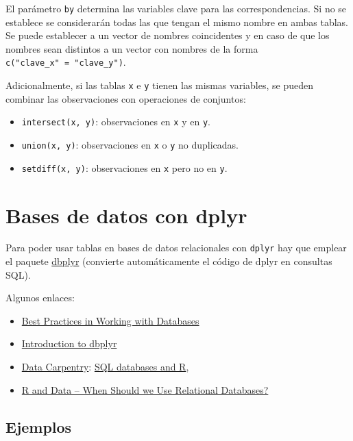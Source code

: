 \documentclass[
]{book}
\theoremstyle{break}
\theoremstyle{nonumberplain}
\begin{document}
El parámetro \texttt{by} determina las variables clave para las correspondencias.
Si no se establece se considerarán todas las que tengan el mismo nombre en ambas tablas.
Se puede establecer a un vector de nombres coincidentes y en caso de que los nombres sean distintos a un vector con nombres de la forma \texttt{c("clave\_x"\ =\ "clave\_y")}.

Adicionalmente, si las tablas \texttt{x} e \texttt{y} tienen las mismas variables, se pueden combinar las observaciones con operaciones de conjuntos:

\begin{itemize}
\item
  \texttt{intersect(x,\ y)}: observaciones en \texttt{x} y en \texttt{y}.
\item
  \texttt{union(x,\ y)}: observaciones en \texttt{x} o \texttt{y} no duplicadas.
\item
  \texttt{setdiff(x,\ y)}: observaciones en \texttt{x} pero no en \texttt{y}.
\end{itemize}

\hypertarget{dbplyr}{%
\section{Bases de datos con dplyr}\label{dbplyr}}

Para poder usar tablas en bases de datos relacionales con \texttt{dplyr} hay que emplear el paquete \href{https://dbplyr.tidyverse.org}{dbplyr} (convierte automáticamente el código de dplyr en consultas SQL).

Algunos enlaces:

\begin{itemize}
\item
  \href{https://solutions.posit.co/connections/db}{Best Practices in Working with Databases}
\item
  \href{https://dbplyr.tidyverse.org/articles/dbplyr.html}{Introduction to dbplyr}
\item
  \href{https://datacarpentry.org/R-ecology-lesson/index.html}{Data Carpentry}:
  \href{https://datacarpentry.org/R-ecology-lesson/05-r-and-databases.html}{SQL databases and R},
\item
  \href{https://intellixus.com/2018/06/29/r-and-data-when-should-we-use-relational-databases}{R and Data -- When Should we Use Relational Databases?}
\end{itemize}

\hypertarget{ejemplos}{%
\subsection{Ejemplos}\label{ejemplos}}
\end{document}
